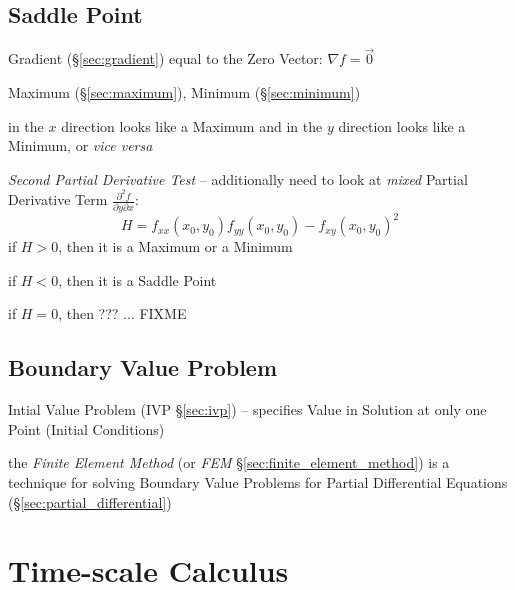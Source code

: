 {\subsection{Saddle Point}\label{sec:saddle_point}

Gradient (\S\ref{sec:gradient}) equal to the Zero Vector: $\nabla{f} = \vec{0}$

Maximum (\S\ref{sec:maximum}), Minimum (\S\ref{sec:minimum})

in the $x$ direction looks like a Maximum and in the $y$ direction looks like a
Minimum, or \emph{vice versa}

\emph{Second Partial Derivative Test} -- additionally need to look at
\emph{mixed} Partial Derivative Term
$\frac{\partial^2{f}}{\partial{y}\partial{x}}$:
\[
  H = f_{xx}(x_0,y_0)f_{yy}(x_0,y_0) - f_{xy}(x_0,y_0)^2
\]
if $H > 0$, then it is a Maximum or a Minimum

if $H < 0$, then it is a Saddle Point

if $H = 0$, then ??? ... FIXME



\subsection{Boundary Value Problem}\label{sec:boundary_value_problem}


\fist Intial Value Problem (IVP \S\ref{sec:ivp}) -- specifies Value in Solution
at only one Point (Initial Conditions)


\fist the \emph{Finite Element Method} (or \emph{FEM}
\S\ref{sec:finite_element_method}) is a technique for solving Boundary Value
Problems for Partial Differential Equations (\S\ref{sec:partial_differential})



\section{Time-scale Calculus}\label{sec:timescale_calculus}

}
